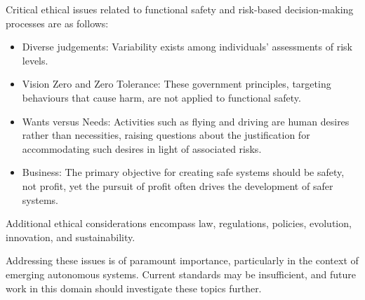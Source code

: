 \documentclass[./dissertation.tex]{subfiles}
\begin{document}
Critical ethical issues related to functional safety and risk-based decision-making processes are as follows:

\begin{itemize}
\item Diverse judgements: Variability exists among individuals' assessments of risk levels.
\item Vision Zero and Zero Tolerance: These government principles, targeting behaviours that cause harm, are not applied to functional safety.
\item Wants versus Needs: Activities such as flying and driving are human desires rather than necessities, raising questions about the justification for accommodating such desires in light of associated risks.
\item Business: The primary objective for creating safe systems should be safety, not profit, yet the pursuit of profit often drives the development of safer systems.

\end{itemize}
Additional ethical considerations encompass law, regulations, policies, evolution, innovation, and sustainability.

Addressing these issues is of paramount importance, particularly in the context of emerging autonomous systems. Current standards may be insufficient, and future work in this domain should investigate these topics further.
\end{document}
